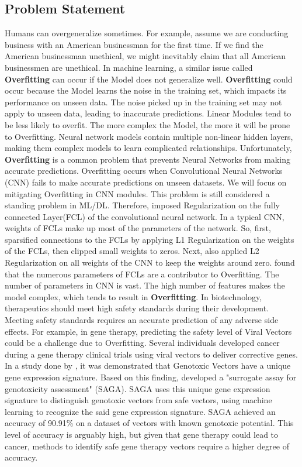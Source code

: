 \documentclass[oneside,12pt,article]{article}
\begin{document}
 
 
 \subsection{Problem Statement}
 	 	Humans can overgeneralize sometimes. For example, assume we are conducting business with an American businessman for the first time. If we find the American businessman unethical, we might inevitably claim that all American businessmen are unethical. In machine learning, a similar issue called \textbf{Overfitting} can occur if the Model does not generalize well. \textbf{Overfitting} could occur because the Model learns the noise in the training set, which impacts its performance on unseen data. The noise picked up in the training set may not apply to unseen data, leading to inaccurate predictions. \gls{Linear Modules} tend to be less likely to overfit. The more complex the Model, the more it will be prone to Overfitting. Neural network models contain multiple non-linear hidden layers, making them complex models to learn complicated relationships. Unfortunately, \textbf{Overfitting} is a common problem that prevents Neural Networks from making accurate predictions. Overfitting occurs when Convolutional Neural Networks (CNN) fails to make accurate predictions on unseen datasets. We will focus on mitigating Overfitting in CNN modules. This problem is still considered a standing problem in ML/DL\cite{Xu2019OverfittingRB}. Therefore, \cite{Xu2019OverfittingRB} imposed Regularization on the fully connected Layer(FCL) of the convolutional neural network. In a typical CNN, weights of FCLs make up most of the parameters of the network. So, first, \cite{Xu2019OverfittingRB} sparsified connections to the FCLs by applying L1 Regularization on the weights of the FCLs, then clipped small weights to zeros. Next, \cite{Xu2019OverfittingRB} also applied L2 Regularization on all weights of the CNN to keep the weights around zero. \cite{Xu2019OverfittingRB} found that the numerous parameters of FCLs are a contributor to Overfitting. The number of parameters in CNN is vast. The high number of features makes the model complex, which tends to result in \textbf{Overfitting}. In biotechnology, therapeutics should meet high safety standards during their development. Meeting safety standards requires an accurate prediction of any adverse side effects. For example, in gene therapy, predicting the safety level of \gls{Viral Vectors} could be a challenge due to Overfitting. Several individuals developed cancer during a gene therapy clinical trials using viral vectors to deliver corrective genes. In a study done by \cite{schwarzer2021predicting}, it was demonstrated that \gls{Genotoxic Vectors} have a unique gene expression signature. Based on this finding, \cite{schwarzer2021predicting} developed a "surrogate assay for genotoxicity assessment" (SAGA). SAGA uses this unique gene expression signature to distinguish genotoxic vectors from safe vectors, using machine learning to recognize the said gene expression signature. SAGA achieved an accuracy of 90.91\% on a dataset of vectors with known genotoxic potential. This level of accuracy is arguably high, but given that gene therapy could lead to cancer, methods to identify safe gene therapy vectors require a higher degree of accuracy.  
\end{document}
